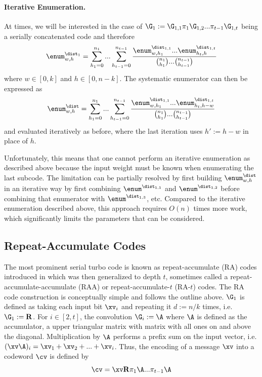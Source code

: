 \paragraph{Iterative Enumeration.} At times, we will be interested in the case of $\G_1:=\G_{1,1}\pi_1\G_{1,2}...\pi_{t-1}\G_{1,t}$ being a serially concatenated code and therefore
$$
\enum^{\dist_1}_{w,h}=\sum_{h_1=0}^{n_1}...\sum_{h_{t-1}=0}^{n_{t-1}}\frac{\enum^{\dist_{1,1}}_{w,h_1} ... \enum^{\dist_{1,t}}_{h_t,h} }{{n_1\choose h_1}...{n_{t-1}\choose h_{t-1}}}
$$
where $w\in [0,k]$ and $h\in [0,n-k]$. The systematic enumerator can then be expressed as
$$
\enum^{\dist}_{w,h}=\sum_{h_1=0}^{n_1}...\sum_{h_{t-1}=0}^{n_{t-1}}\frac{\enum^{\dist_{1,1}}_{w,h_1} ... \enum^{\dist_{1,t}}_{h_t,h-w} }{{n_1\choose h_1}...{n_{t-1}\choose h_{t-1}}}
$$
and evaluated iteratively as before, where the last iteration uses $h':=h-w$ in place of $h$.

Unfortunately, this means that one cannot perform an iterative enumeration as described above because the input weight must be known when enumerating the last subcode. The limitation can be partially resolved by first building $\enum^{\dist}_{w,h}$ in an iterative way by first combining $\enum^{\dist_{1,1}}$ and $\enum^{\dist_{1,2}}$ before combining that enumerator with $\enum^{\dist_{1,3}}$, etc. Compared to the iterative enumeration described above, this approach requires $O(n)$ times more work, which significantly limits the parameters that can be considered.

\subsection{Repeat-Accumulate Codes}\label{sec:RA}

The most prominent serial turbo code is known as repeat-accumulate (RA) codes introduced in \cite{ra,kahale1998minimum} which was then generalized to depth $t$, sometimes called a repeat-accumulate-accumulate (RAA) or repeat-accumulate-$t$ (RA-$t$) codes. The RA code construction is conceptually simple and follows the outline above. $\G_1$ is defined as taking each input bit $\xv_i$ and repeating it $d:=n/k$ times, i.e. $\G_1:=\mathbf{R}$.  For $i\in [2,t]$, the convolution $\G_i:=\A$ where $\A$ is defined as the accumulator, a upper triangular matrix with matrix with all ones on and above the diagonal. Multiplication by $\A$ performs a prefix sum on the input vector, i.e. $(\xv \A)_i = \xv_1+\xv_2 + ... +\xv_i$.
Thus, the encoding of a message $\xv$ into a codeword $\cv$ is defined by
\[
  \cv =\xv \mathbf{R} \pi_1 \A ... \pi_{t-1} \A
\]

